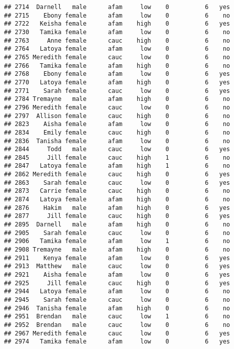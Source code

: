 \documentclass[
]{article}
\begin{document}
\begin{verbatim}
## 2714  Darnell   male      afam     low    0          6   yes
## 2715    Ebony female      afam     low    0          6    no
## 2722   Keisha female      afam    high    0          6   yes
## 2730   Tamika female      afam     low    0          6    no
## 2763     Anne female      cauc    high    0          6    no
## 2764   Latoya female      afam     low    0          6    no
## 2765 Meredith female      cauc     low    0          6    no
## 2766   Tamika female      afam    high    0          6    no
## 2768    Ebony female      afam     low    0          6   yes
## 2770   Latoya female      afam    high    0          6   yes
## 2771    Sarah female      cauc     low    0          6   yes
## 2784 Tremayne   male      afam    high    0          6    no
## 2796 Meredith female      cauc     low    0          6    no
## 2797  Allison female      cauc    high    0          6    no
## 2823    Aisha female      afam     low    0          6    no
## 2834    Emily female      cauc    high    0          6    no
## 2836  Tanisha female      afam     low    0          6    no
## 2844     Todd   male      cauc     low    0          6   yes
## 2845     Jill female      cauc    high    1          6    no
## 2847   Latoya female      afam    high    1          6    no
## 2862 Meredith female      cauc    high    0          6   yes
## 2863    Sarah female      cauc     low    0          6   yes
## 2873   Carrie female      cauc    high    0          6    no
## 2874   Latoya female      afam    high    0          6    no
## 2876    Hakim   male      afam    high    0          6   yes
## 2877     Jill female      cauc    high    0          6   yes
## 2895  Darnell   male      afam    high    0          6    no
## 2905    Sarah female      cauc     low    0          6    no
## 2906   Tamika female      afam     low    1          6    no
## 2908 Tremayne   male      afam    high    0          6    no
## 2911    Kenya female      afam     low    0          6   yes
## 2913  Matthew   male      cauc     low    0          6   yes
## 2921    Aisha female      afam     low    0          6   yes
## 2925     Jill female      cauc    high    0          6   yes
## 2944   Latoya female      afam     low    0          6    no
## 2945    Sarah female      cauc     low    0          6    no
## 2946  Tanisha female      afam    high    0          6    no
## 2951  Brendan   male      cauc     low    1          6    no
## 2952  Brendan   male      cauc     low    0          6    no
## 2967 Meredith female      cauc     low    0          6   yes
## 2974   Tamika female      afam     low    0          6   yes

\end{verbatim}
\end{document}
